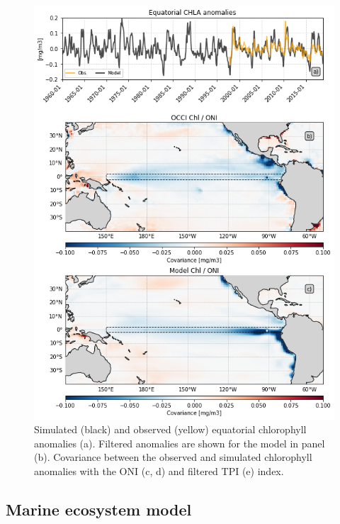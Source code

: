 \begin{figure}
	\centering
	\includegraphics[scale=0.4]{figs/fig2.png}
	\caption{Simulated (black) and observed (yellow) equatorial chlorophyll anomalies (a). Filtered anomalies are shown for the model in panel (b). Covariance between the observed and simulated chlorophyll anomalies with the ONI (c, d) and filtered TPI (e) index.}
	\label{fig:nemo-sat-chl}
\end{figure}

\subsection{Marine ecosystem model}

